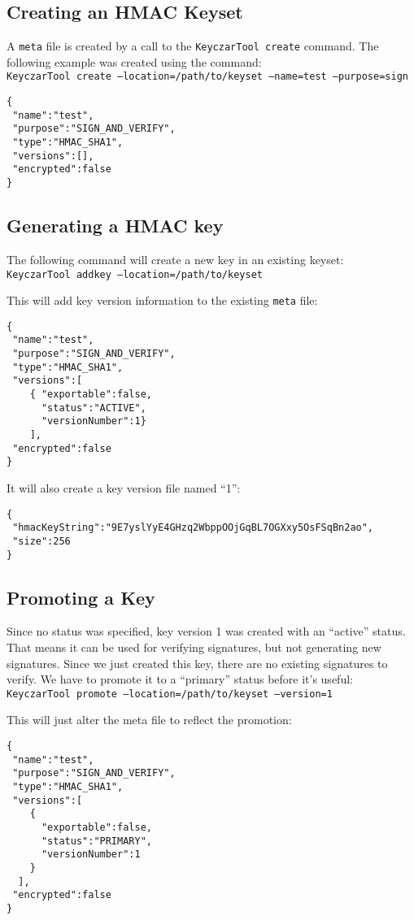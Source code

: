 \documentclass{llncs}
\begin{document}
\subsection{Creating an HMAC Keyset}
A {\tt meta} file is created by a call to the {\tt KeyczarTool create} command.
The following example was created using the command: \\
{\tt KeyczarTool create --location=/path/to/keyset --name=test --purpose=sign}

\begin{verbatim}
{
 "name":"test",
 "purpose":"SIGN_AND_VERIFY",
 "type":"HMAC_SHA1",
 "versions":[],
 "encrypted":false
}
\end{verbatim}

\subsection{Generating a HMAC key}

The following command will create a new key in an existing keyset: \\
{\tt KeyczarTool addkey --location=/path/to/keyset}

This will add key version information to the existing {\tt meta} file:
\begin{verbatim}
{
 "name":"test",
 "purpose":"SIGN_AND_VERIFY",
 "type":"HMAC_SHA1",
 "versions":[
    { "exportable":false,
      "status":"ACTIVE",
      "versionNumber":1}
    ],
 "encrypted":false
}
\end{verbatim}

It will also create a key version file named ``1'':
\begin{verbatim}
{
 "hmacKeyString":"9E7yslYyE4GHzq2WbppOOjGqBL7OGXxy5OsFSqBn2ao",
 "size":256
}
\end{verbatim}

\subsection{Promoting a Key}
Since no status was specified, key version 1 was created with an ``active''
status. That means it can be used for verifying signatures, but not generating
new signatures. Since we just created this key, there are no existing
signatures to verify. We have to promote it to a ``primary'' status before
it's useful: \\
{\tt KeyczarTool promote --location=/path/to/keyset --version=1}

This will just alter the meta file to reflect the promotion:
\begin{verbatim}
{
 "name":"test",
 "purpose":"SIGN_AND_VERIFY",
 "type":"HMAC_SHA1",
 "versions":[
    {
      "exportable":false,
      "status":"PRIMARY",
      "versionNumber":1
    }
  ],
 "encrypted":false
}
\end{verbatim}
\end{document}
